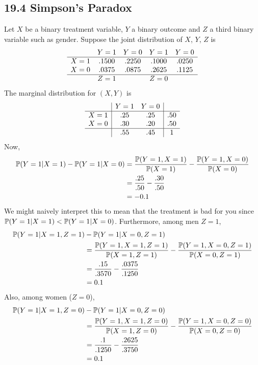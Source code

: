 \subsection*{19.4 Simpson's Paradox}\label{simpsons-paradox}
Let \(X\) be a binary treatment variable, \(Y\) a binary outcome and
\(Z\) a third binary variable such as gender. Suppose the joint
distribution of \(X\), \(Y\), \(Z\) is
\[
\begin{array}{ccccc}
       & Y = 1 & Y = 0 & Y = 1 & Y = 0 \\
\hline
X = 1 & .1500 & .2250 & .1000 & .0250 \\
X = 0 & .0375 & .0875 & .2625 & .1125 \\
\hline
      & Z = 1 & & Z = 0 &
\end{array}
\]
The marginal distribution for \((X, Y)\) is
\[
\begin{array}{c|cc|c}
       & Y = 1 & Y = 0 & \\
\hline
X = 1 & .25 & .25 & .50 \\
X = 0 & .30 & .20 & .50 \\
\hline
      & .55 & .45 & 1
\end{array}
\]
Now,
\begin{align*}
\operatorname{\mathbb{P}}(Y = 1 | X = 1) - \operatorname{\mathbb{P}}(Y = 1 | X = 0) 
&= \frac{\operatorname{\mathbb{P}}(Y = 1, X = 1)}{\operatorname{\mathbb{P}}(X = 1)} - \frac{\operatorname{\mathbb{P}}(Y = 1, X = 0)}{\operatorname{\mathbb{P}}(X = 0)} \\
&= \frac{.25}{.50} - \frac{.30}{.50} \\
&= -0.1
\end{align*}
We might naively interpret this to mean that the treatment is bad for you since \(\operatorname{\mathbb{P}}(Y = 1 | X = 1) < \operatorname{\mathbb{P}}(Y = 1 | X = 0)\). Furthermore, among men \(Z = 1\),
\begin{align*}
\operatorname{\mathbb{P}}(Y = 1 | X = 1, Z = 1) 
&- \operatorname{\mathbb{P}}(Y = 1 | X = 0, Z = 1) \\
&= \frac{\operatorname{\mathbb{P}}(Y = 1, X = 1, Z = 1)}{\operatorname{\mathbb{P}}(X = 1, Z = 1)} - \frac{\operatorname{\mathbb{P}}(Y = 1, X = 0, Z = 1)}{\operatorname{\mathbb{P}}(X = 0, Z = 1)} \\
&= \frac{.15}{.3570} - \frac{.0375}{.1250} \\
&= 0.1
\end{align*}
Also, among women (\(Z = 0\)),
\begin{align*}
\operatorname{\mathbb{P}}(Y = 1 | X = 1, Z = 0) 
&- \operatorname{\mathbb{P}}(Y = 1 | X = 0, Z = 0) \\
&= \frac{\operatorname{\mathbb{P}}(Y = 1, X = 1, Z = 0)}{\operatorname{\mathbb{P}}(X = 1, Z = 0)} - \frac{\operatorname{\mathbb{P}}(Y = 1, X = 0, Z = 0)}{\operatorname{\mathbb{P}}(X = 0, Z = 0)} \\
&= \frac{.1}{.1250} - \frac{.2625}{.3750} \\
&= 0.1
\end{align*}
